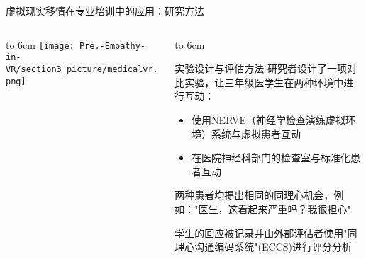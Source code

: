 \documentclass[aspectratio=169,xcolor=dvipsnames]{beamer}
\begin{document}
\begin{frame}{虚拟现实移情在专业培训中的应用：研究方法}
    \begin{columns}[T]
        \begin{column}{0.45\textwidth}
            \vbox to 6cm{
                \vfill
                \centering
                \texttt{[image: Pre.-Empathy-in-VR/section3\_picture/medicalvr.png]}
                \vfill
            }
        \end{column}
        
        \begin{column}{0.55\textwidth}
            \vbox to 6cm{
                \vfill
                \begin{block}{实验设计与评估方法}
                    研究者设计了一项对比实验，让三年级医学生在两种环境中进行互动：
                    \begin{itemize}
                        \item 使用NERVE（神经学检查演练虚拟环境）系统与虚拟患者互动
                        \item 在医院神经科部门的检查室与标准化患者互动
                    \end{itemize}
                    
                    两种患者均提出相同的同理心机会，例如："医生，这看起来严重吗？我很担心"
                    
                    学生的回应被记录并由外部评估者使用"同理心沟通编码系统"(ECCS)进行评分分析
                \end{block}
                \vfill
            }
        \end{column}
    \end{columns}
\end{frame}
\end{document}
